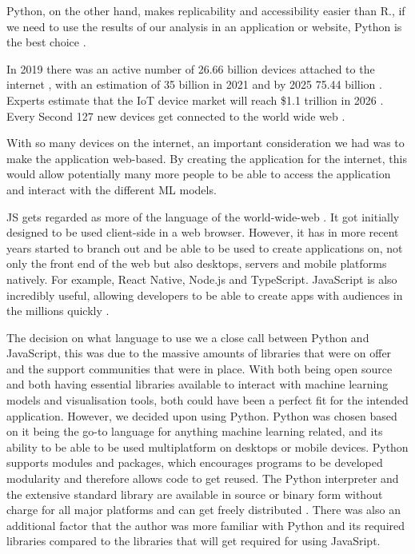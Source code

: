 	Python, on the other hand, makes replicability and accessibility easier than R., if we need to use the results of our analysis in an application or website, Python is the best choice \cite{r_vs_py}.
	
	In 2019 there was an active number of 26.66 billion devices attached to the internet \cite{securitytoday, statista_iot}, with an estimation of 35 billion in 2021 \cite{securitytoday} and by 2025 75.44 billion \cite{statista_iot}. Experts estimate that the IoT device market will reach \$1.1 trillion in 2026 \cite{securitytoday}. Every Second 127 new devices get connected to the world wide web \cite{securitytoday}.
	
	With so many devices on the internet, an important consideration we had was to make the application web-based. By creating the application for the internet, this would allow potentially many more people to be able to access the application and interact with the different ML models. 
	
	JS gets regarded as more of the language of the world-wide-web \cite{web_foundation}. It got initially designed to be used client-side in a web browser. However, it has in more recent years started to branch out and be able to be used to create applications on, not only the front end of the web but also desktops, servers and mobile platforms natively. For example, React Native, Node.js and TypeScript. JavaScript is also incredibly useful, allowing developers to be able to create apps with audiences in the millions quickly \cite{js_springboard}.
	
	The decision on what language to use we a close call between Python and JavaScript, this was due to the massive amounts of libraries that were on offer and the support communities that were in place. With both being open source and both having essential libraries available to interact with machine learning models and visualisation tools, both could have been a perfect fit for the intended application. However, we decided upon using Python. Python was chosen based on it being the go-to language for anything machine learning related, and its ability to be able to be used multiplatform on desktops or mobile devices. Python supports modules and packages, which encourages programs to be developed modularity and therefore allows code to get reused. The Python interpreter and the extensive standard library are available in source or binary form without charge for all major platforms and can get freely distributed \cite{python_desc}. There was also an additional factor that the author was more familiar with Python and its required libraries compared to the libraries that will get required for using JavaSript.

